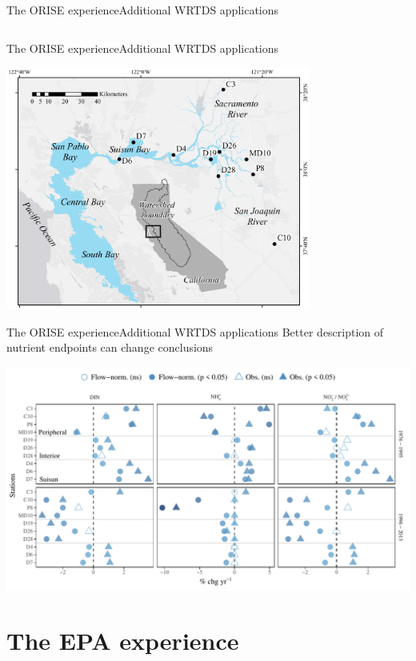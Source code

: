 \documentclass[serif]{beamer}\usepackage[]{graphicx}\usepackage[]{color}
\begin{document}
\begin{frame}{The ORISE experience}{Additional WRTDS applications}
\begin{columns}
\begin{column}{0.65\textwidth}
\end{column}
\end{columns}
\end{frame}

\begin{frame}{The ORISE experience}{Additional WRTDS applications}
\centerline{\includegraphics[width = 0.75\textwidth]{fig/delt_map.pdf}}
\end{frame}

\begin{frame}{The ORISE experience}{Additional WRTDS applications}
Better description of nutrient endpoints can change conclusions
\centerline{\includegraphics[width = \textwidth]{fig/trndcomp1.pdf}}
\end{frame}

\section{The EPA experience}
\end{document}
